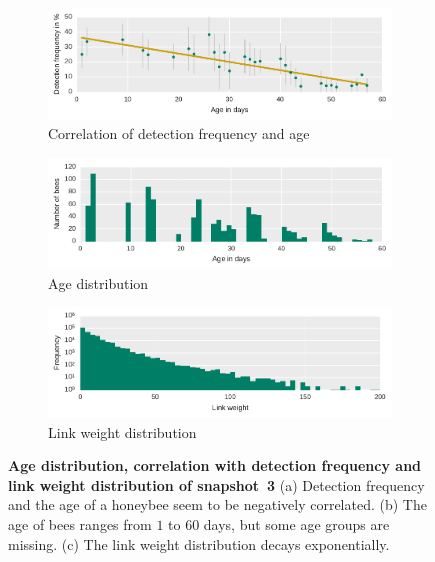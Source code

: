 \begin{figure}[bp]
	\centering
	\begin{subfigure}[b]{1\textwidth}
	\centering
	\includegraphics[width=1.0\textwidth]{Figures/n3_detFvsAge}
	\caption[Correlation]{Correlation of detection frequency and age}
	\label{fig:n3detfVSage}
	\end{subfigure} 
	\begin{subfigure}[b]{1\textwidth}
	\centering
	\includegraphics[width=1.0\textwidth]{Figures/n3_ages.pdf}
	\caption[Age distribution]{Age distribution}
	\label{fig:n3ageDist}
	\end{subfigure}	\begin{subfigure}[b]{1\textwidth}
	\centering
	\includegraphics[width=1.0\textwidth]{Figures/n3-edgeWeightDist.pdf}
	\caption[Link weight distribution]{Link weight distribution}
	\label{fig:edgeWdist}
	\end{subfigure}
	\caption[Age distribution, correlation with detection frequency and link weight distribution of snapshot~3]{\textbf{Age distribution, correlation with detection frequency and link weight distribution of snapshot~3} (a) Detection frequency and the age of a honeybee seem to be negatively correlated. (b) The age of bees ranges from $1$ to $60$ days, but some age groups are missing. (c) The link weight distribution decays exponentially.}
	\label{fig:ageDetF}
\end{figure}